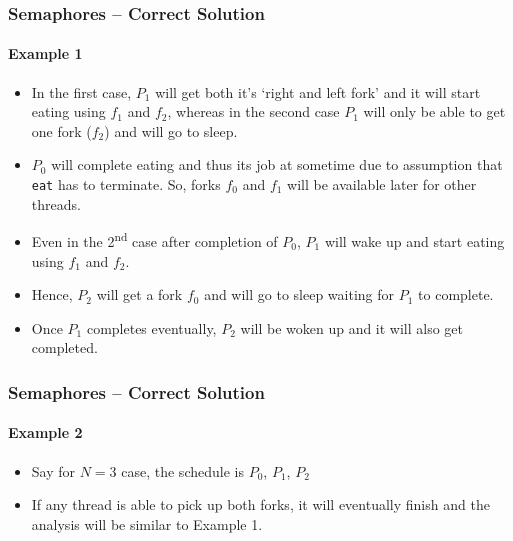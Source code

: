 \documentclass[aspectratio=169, handout, 10pt]{beamer}
\theoremstyle{example}
\begin{document}
\begin{frame}[fragile]\frametitle{Semaphores -- Correct Solution}\framesubtitle{Example 1}
  \begin{example}[continued]
  \begin{itemize}
  \pause\item In the first case, $P_1$ will get both it's `right and left fork' and it will start eating using $f_1$ and $f_2$, whereas in the second case $P_1$ will only be able to get one fork ($f_2$) and will go to sleep.
  \pause\item $P_0$ will complete eating and thus its job at sometime due to assumption that \verb!eat! has to terminate. So, forks $f_0$ and $f_1$ will be available later for other threads.
  \pause\item Even in the 2\textsuperscript{nd} case after completion of $P_0$, $P_1$ will wake up and start eating using $f_1$ and $f_2$. %
  \pause\item Hence, $P_2$ will get a fork $f_0$ and will go to sleep waiting for $P_1$ to complete.
  \pause\item Once $P_1$ completes eventually, $P_2$ will be woken up and it will also get completed.
  \end{itemize}
  \end{example}
\end{frame}
\begin{frame}[fragile]\frametitle{Semaphores -- Correct Solution}\framesubtitle{Example 2}
  \begin{example}
  \begin{itemize}
  \pause\item Say for $N=3$ case, the schedule is $P_0$, $P_1$, $P_2$
  \pause\item If any thread is able to pick up both forks, it will eventually finish and the analysis will be similar to Example 1. 
  \end{itemize}
  \end{example}
\end{frame}
\end{document}
